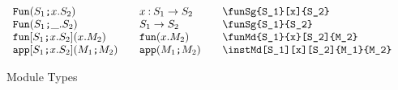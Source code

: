 \documentclass[11pt]{article}
\begin{document}
\begin{figure}
\begin{small}
\begin{displaymath}
\begin{array}{l@{\qquad}l@{\qquad}l@{\qquad}l}
        \funSg{S_1}[x]{S_2}             & \funSg*{S_1}[x]{S_2}  & \verb|\funSg{S_1}[x]{S_2}|                       \\
        \funSg{S_1}{S_2}                & \funSg*{S_1}{S_2}     & \verb|\funSg{S_1}{S_2}| \\
        \funMd{S_1}{x}[S_2]{M_2}       & \funMd*{S_1}{x}[S_2]{M_2} & \verb|\funMd{S_1}{x}[S_2]{M_2}|            \\
        \instMd[S_1][x][S_2]{M_1}{M_2} & \instMd*{M_1}{M_2}   & \verb|\instMd[S_1][x][S_2]{M_1}{M_2}|
      \end{array}
    \end{displaymath}
  \end{small}

  \caption{Module Types}
  \label{fig:mod}
\end{figure}
\end{document}
